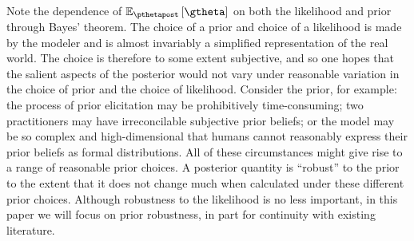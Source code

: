\documentclass{article}\usepackage[]{graphicx}\usepackage[]{color}
\theoremstyle{plain}
\theoremstyle{definition}
\theoremstyle{plain}
\theoremstyle{plain}
\theoremstyle{plain}
\theoremstyle{plain}
\begin{document}
Note the dependence of $\epgtheta$ on both the likelihood and prior
through Bayes' theorem. The choice of a prior and choice of a likelihood
is made by the modeler and is almost invariably a simplified representation
of the real world. The choice is therefore to some extent subjective,
and so one hopes that the salient aspects of the posterior would not
vary under reasonable variation in the choice of prior and the choice
of likelihood. Consider the prior, for example: the process of prior
elicitation may be prohibitively time-consuming; two practitioners
may have irreconcilable subjective prior beliefs; or the model may
be so complex and high-dimensional that humans cannot reasonably express
their prior beliefs as formal distributions. All of these circumstances
might give rise to a range of reasonable prior choices. A posterior
quantity is ``robust'' to the prior to the extent that it does not
change much when calculated under these different prior choices. Although
robustness to the likelihood is no less important, in this paper we
will focus on prior robustness, in part for continuity with existing
literature.
\end{document}
